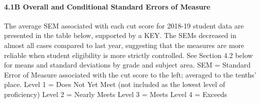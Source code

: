 \documentclass[]{article}
\let\oldparagraph\paragraph
\renewcommand{\paragraph}[1]{\oldparagraph{#1}\mbox{}}
\begin{document}
\hypertarget{b-overall-and-conditional-standard-errors-of-measure}{%
\paragraph{4.1B Overall and Conditional Standard Errors of
Measure}\label{b-overall-and-conditional-standard-errors-of-measure}}

The average SEM associated with each cut score for 2018-19 student data
are presented in the table below, supported by a KEY. The SEMs decreased
in almost all cases compared to last year, suggesting that the measures
are more reliable when student eligibility is more strictly controlled.
See Section 4.2 below for means and standard deviations by grade and
subject area. SEM = Standard Error of Measure associated with the cut
score to the left; averaged to the tenths' place. Level 1 = Does Not Yet
Meet (not included as the lowest level of proficiency) Level 2 = Nearly
Meets Level 3 = Meets Level 4 = Exceeds
\end{document}
